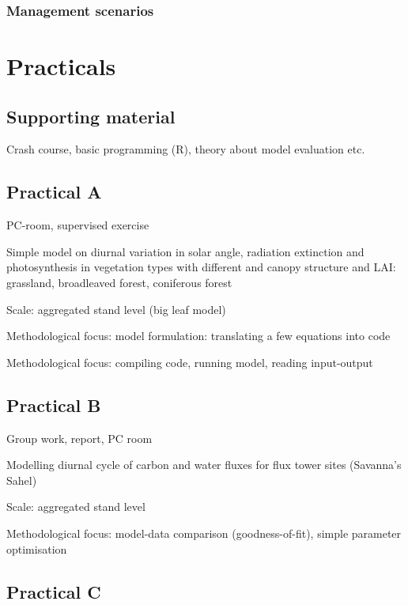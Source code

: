\documentclass[]{book}
\begin{document}
\section{Management scenarios}\label{management-scenarios}

\part{Practicals}\label{part-practicals}

\chapter*{Supporting material}\label{supporting-material}

Crash course, basic programming (R), theory about model evaluation etc.

\chapter*{Practical A}\label{practical-a}

PC-room, supervised exercise

Simple model on diurnal variation in solar angle, radiation extinction
and photosynthesis in vegetation types with different and canopy
structure and LAI: grassland, broadleaved forest, coniferous forest

Scale: aggregated stand level (big leaf model)

Methodological focus: model formulation: translating a few equations
into code

Methodological focus: compiling code, running model, reading
input-output

\chapter*{Practical B}\label{practical-b}

Group work, report, PC room

Modelling diurnal cycle of carbon and water fluxes for flux tower sites
(Savanna's Sahel)

Scale: aggregated stand level

Methodological focus: model-data comparison (goodness-of-fit), simple
parameter optimisation

\chapter*{Practical C}\label{practical-c}
\end{document}
